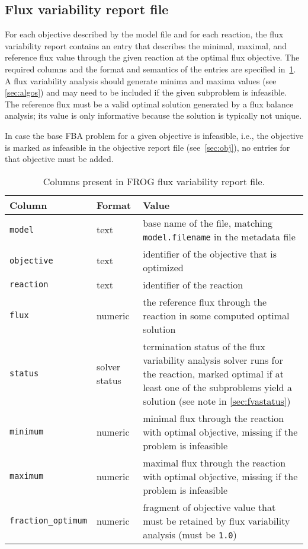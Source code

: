 \subsection{Flux variability report file}
\label{sec:fva}
For each objective described by the model file and for each reaction, the flux variability report contains an entry that describes the minimal, maximal, and reference flux value through the given reaction at the optimal flux objective. The required columns and the format and semantics of the entries are specified in~\cref{tab:fvafields}.
A flux variability analysis should generate minima and maxima values (see \cref{sec:algos}) and may need to be included if the given subproblem is infeasible. The reference flux must be a valid optimal solution generated by a flux balance analysis; its value is only informative because the solution is typically not unique.

In case the base FBA problem for a given objective is infeasible, i.e., the objective is marked as infeasible in the objective report file (see~\cref{sec:obj}), no entries for that objective must be added.


\begin{table}\tablefont
\begin{tabular}{llp{30em}}
\toprule
Column & Format & Value \\
\midrule
\verb|model|
 & text
 & base name of the file, matching \verb|model.filename| in the metadata file
 \\
\verb|objective|
 & text
 & identifier of the objective that is optimized
 \\
\verb|reaction|
 & text
 & identifier of the reaction
 \\
\verb|flux|
 & numeric
 & the reference flux through the reaction in some computed optimal solution
 \\
\verb|status|
 & solver status
 & termination status of the flux variability analysis solver runs for the reaction, marked optimal if at least one of the subproblems yield a solution (see note in \cref{sec:fvastatus})
 \\
\verb|minimum|
 & numeric
 & minimal flux through the reaction with optimal objective, missing if the problem is infeasible
 \\
\verb|maximum|
 & numeric
 & maximal flux through the reaction with optimal objective, missing if the problem is infeasible
 \\
\verb|fraction_optimum|
 & numeric
 & fragment of objective value that must be retained by flux variability analysis (must be \verb|1.0|)
 \\
\bottomrule
\end{tabular}
\caption{Columns present in FROG flux variability report file.}
\label{tab:fvafields}
\end{table}

